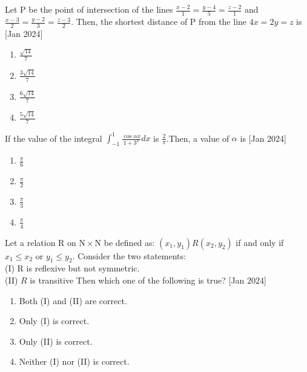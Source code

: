  	\item{
			
			Let P be the point of intersection of the lines $\frac{x-2}{1}=\frac{y-4}{5}=\frac{z-2}{1}$ and
			$\frac{x-3}{2}=\frac{y-2}{3}=\frac{z-3}{2}$. Then, the shortest distance of P from the line $4 x=2 y=z$ is\hfill
			{[Jan 2024]}
			
			\begin{multicols}{4}
				\begin{enumerate}
					\item $\frac{\sqrt{14}}{7}$
					\item $\frac{3 \sqrt{14}}{7}$
					\item $\frac{6 \sqrt{14}}{7}$
					\item $\frac{5 \sqrt{14}}{7}$
				\end{enumerate}
			\end{multicols}
			
		}
    \item{
          	
          	If the value of the integral $\int_{-1}^{1} \frac{\cos \alpha x}{1+3^{x}} d x$ is $\frac{2}{\pi}$.Then, a value of $\alpha$ is
             \text{ }
             \hfill
                {[Jan 2024]}
            \begin{multicols}{4}
                \begin{enumerate}
                	\item $\frac{\pi}{6}$
                	\item $\frac{\pi}{2}$
                	\item $\frac{\pi}{3}$
                	\item $\frac{\pi}{4}$
                \end{enumerate}
            \end{multicols}

        
        }
    \item{
	        
	       	Let a relation R on $\mathrm{N} \times \mathrm{N}$ be defined as:
	        $\left(x_{1}, y_{1}\right) R\left(x_{2}, y_{2}\right)$ if and only if $x_{1} \leq x_{2}$ or $y_{1} \leq y_{2}$.
	        Consider the two statements:\\
	        (I) R is reflexive but not symmetric.\\
	        (II) $R$ is transitive
	        Then which one of the following is true?
             \hfill
                {[Jan 2024]}
            \begin{multicols}{2}
                \begin{enumerate}
                	\item Both (I) and (II) are correct.
                	\item Only (I) is correct.
                	\item Only (II) is correct.
                	\item Neither (I) nor (II) is correct.
                \end{enumerate}
            \end{multicols}
        
        }
